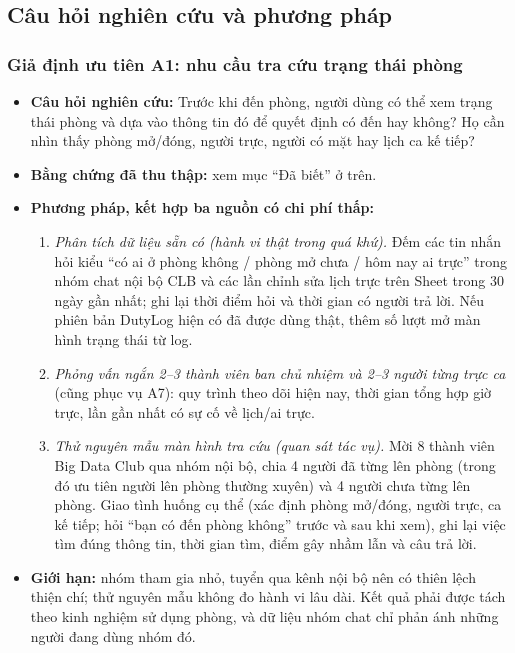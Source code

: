 \subsection{Câu hỏi nghiên cứu và phương pháp}
\subsubsection*{Giả định ưu tiên A1: nhu cầu tra cứu trạng thái phòng}
\begin{itemize}
    \item \textbf{Câu hỏi nghiên cứu:} Trước khi đến phòng, người dùng có thể xem trạng thái phòng và dựa vào thông tin đó để quyết định có đến hay không? Họ cần nhìn thấy phòng mở/đóng, người trực, người có mặt hay lịch ca kế tiếp?
    \item \textbf{Bằng chứng đã thu thập:} xem mục ``Đã biết'' ở trên.
    \item \textbf{Phương pháp, kết hợp ba nguồn có chi phí thấp:}
    \begin{enumerate}[nosep]
        \item \emph{Phân tích dữ liệu sẵn có (hành vi thật trong quá khứ).} Đếm các tin nhắn hỏi kiểu ``có ai ở phòng không / phòng mở chưa / hôm nay ai trực'' trong nhóm chat nội bộ CLB và các lần chỉnh sửa lịch trực trên Sheet trong 30 ngày gần nhất; ghi lại thời điểm hỏi và thời gian có người trả lời. Nếu phiên bản DutyLog hiện có đã được dùng thật, thêm số lượt mở màn hình trạng thái từ log.
        \item \emph{Phỏng vấn ngắn 2--3 thành viên ban chủ nhiệm và 2--3 người từng trực ca} (cũng phục vụ A7): quy trình theo dõi hiện nay, thời gian tổng hợp giờ trực, lần gần nhất có sự cố về lịch/ai trực.
        \item \emph{Thử nguyên mẫu màn hình tra cứu (quan sát tác vụ).} Mời 8 thành viên Big Data Club qua nhóm nội bộ, chia 4 người đã từng lên phòng (trong đó ưu tiên người lên phòng thường xuyên) và 4 người chưa từng lên phòng. Giao tình huống cụ thể (xác định phòng mở/đóng, người trực, ca kế tiếp; hỏi ``bạn có đến phòng không'' trước và sau khi xem), ghi lại việc tìm đúng thông tin, thời gian tìm, điểm gây nhầm lẫn và câu trả lời.
    \end{enumerate}
    \item \textbf{Giới hạn:} nhóm tham gia nhỏ, tuyển qua kênh nội bộ nên có thiên lệch thiện chí; thử nguyên mẫu không đo hành vi lâu dài. Kết quả phải được tách theo kinh nghiệm sử dụng phòng, và dữ liệu nhóm chat chỉ phản ánh những người đang dùng nhóm đó.
\end{itemize}

